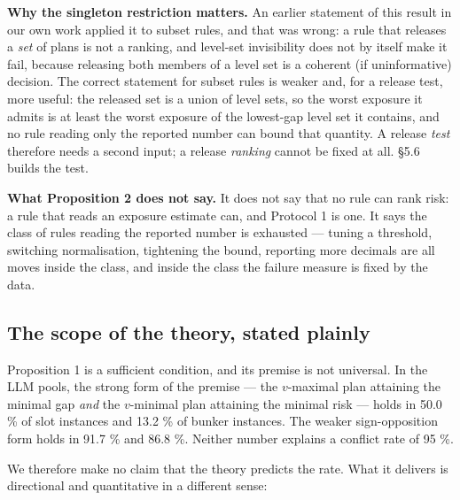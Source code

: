 \documentclass[preprint,12pt,letterpaper]{elsarticle}
\theoremstyle{definition}
\theoremstyle{plain}
\begin{document}
\textbf{Why the singleton restriction matters.} An earlier statement of this result in our own work applied it to subset rules, and that was wrong: a rule that releases a \textit{set} of plans is not a ranking, and level-set invisibility does not by itself make it fail, because releasing both members of a level set is a coherent (if uninformative) decision. The correct statement for subset rules is weaker and, for a release test, more useful: the released set is a union of level sets, so the worst exposure it admits is at least the worst exposure of the lowest-gap level set it contains, and no rule reading only the reported number can bound that quantity. A release \textit{test} therefore needs a second input; a release \textit{ranking} cannot be fixed at all. \S 5.6 builds the test.

\textbf{What Proposition 2 does not say.} It does not say that no rule can rank risk: a rule that reads an exposure estimate can, and Protocol 1 is one. It says the class of rules reading the reported number is exhausted --- tuning a threshold, switching normalisation, tightening the bound, reporting more decimals are all moves inside the class, and inside the class the failure measure is fixed by the data.

\subsection{The scope of the theory, stated plainly}

Proposition 1 is a sufficient condition, and its premise is not universal. In the LLM pools, the strong form of the premise --- the $v$-maximal plan attaining the minimal gap \textit{and} the $v$-minimal plan attaining the minimal risk --- holds in 50.0 \% of slot instances and 13.2 \% of bunker instances. The weaker sign-opposition form holds in 91.7 \% and 86.8 \%. Neither number explains a conflict rate of 95 \%.

We therefore make no claim that the theory predicts the rate. What it delivers is directional and quantitative in a different sense:
\end{document}
